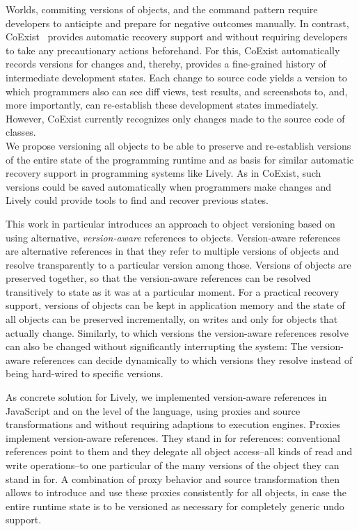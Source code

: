 Worlds, commiting versions of objects, and the command pattern require developers to anticipte and prepare for negative outcomes manually.
In contrast, CoExist~\cite{Steinert2012COE} provides automatic recovery support and without requiring developers to take any precautionary actions beforehand.
For this, CoExist automatically records versions for changes and, thereby, provides a fine-grained history of intermediate development states.
Each change to source code yields a version to which programmers also can see diff views, test results, and screenshots to, and, more importantly, can re-establish these development states immediately.
However, CoExist currently recognizes only changes made to the source code of classes.\\

We propose versioning all objects to be able to preserve and re-establish versions of the entire state of the programming runtime and as basis for similar automatic recovery support in programming systems like Lively.
As in CoExist, such versions could be saved automatically when programmers make changes and Lively could provide tools to find and recover previous states.

This work in particular introduces an approach to object versioning based on using alternative, \emph{version-aware} references to objects.
Version-aware references are alternative references in that they refer to multiple versions of objects and resolve transparently to a particular version among those.
Versions of objects are preserved together, so that the version-aware references can be resolved transitively to state as it was at a particular moment.
For a practical recovery support, versions of objects can be kept in application memory and the state of all objects can be preserved incrementally, on writes and only for objects that actually change.
Similarly, to which versions the version-aware references resolve can also be changed without significantly interrupting the system:
The version-aware references can decide dynamically to which versions they resolve instead of being hard-wired to specific versions.

As concrete solution for Lively, we implemented version-aware references in JavaScript and on the level of the language, using proxies and source transformations and without requiring adaptions to execution engines.
Proxies implement version-aware references.
They stand in for references: conventional references point to them and they delegate all object access--all kinds of read and write operations--to one particular of the many versions of the object they can stand in for.
A combination of proxy behavior and source transformation then allows to introduce and use these proxies consistently for all objects, in case the entire runtime state is to be versioned as necessary for completely generic undo support.

